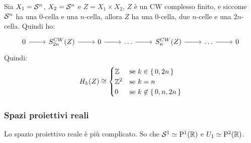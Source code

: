 \begin{example}
  Sia $ X_1 = \mathcal{S}^{n} $, $ X_2 = \mathcal{S}^{n} $ e $ Z = X_1 \times X_2 $, $ Z $ è un CW
  complesso finito, e siccome $ \mathcal{S}^{n} $ ha una $ 0 $-cella e una $ n $-cella,
  allora $ Z $ ha una $ 0 $-cella, due $ n $-celle e una $ 2n $-cella.
  Quindi ho:
  \[
    \begin{tikzcd}
      0 \rar & S_{2n}^{CW}(Z) \rar & 0 \rar & \dots \rar & S_n^{CW}(Z) \rar & \dots \rar & 0
    \end{tikzcd}
  \]
  Quindi:
  \[
    H_k(Z) \cong
    \begin{cases}
      \mathbb{Z} & \text{se } k \in \set{0, 2n} \\
      \mathbb{Z}^2 & \text{se } k = n \\
      0 & \text{se } k \not \in \set{0, n, 2n}
    \end{cases}
  \]
\end{example}

\subsubsection{Spazi proiettivi reali}
Lo spazio proiettivo reale è più complicato. So che
$ \mathcal{S}^{1} \simeq \mathrm{P}^1 (\mathbb{R}) $ e $ U_1 \simeq \mathrm{P}^2 (\mathbb{R}) $.

